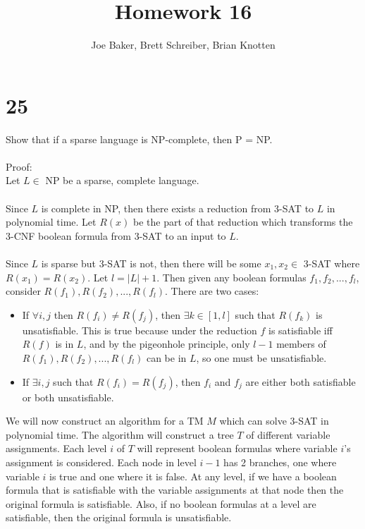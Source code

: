 \documentclass[letterpaper,notitlepage,twoside]{article}
\begin{document}
\title{Homework 16}
\author{Joe Baker, Brett Schreiber, Brian Knotten}
\maketitle

\section*{25}
Show that if a sparse language is NP-complete, then P = NP.
\\\\
Proof:
\\
Let $L \in $ NP be a sparse, complete language.
\\\\
Since $L$ is complete in NP, then there exists a reduction from 3-SAT to $L$ in polynomial time. Let $R(x)$ be the part of that reduction which transforms the 3-CNF boolean formula from 3-SAT to an input to $L$.
\\\\
Since $L$ is sparse but 3-SAT is not, then there will be some $x_1,x_2 \in $ 3-SAT where $R(x_1) = R(x_2)$. Let $l = \left|L\right| + 1$. Then given any boolean formulas $f_1,f_2,...,f_l$, consider $R(f_1),R(f_2),...,R(f_l)$. There are two cases:
\begin{itemize}
\item If $\forall i,j$ then $R(f_i) \neq R(f_j)$, then $\exists k \in \left[ 1,l \right]$ such that $R(f_k)$ is unsatisfiable. This is true because under the reduction $f$ is satisfiable iff $R(f)$ is in $L$, and by the pigeonhole principle, only $l-1$ members of $R(f_1),R(f_2),...,R(f_l)$ can be in $L$, so one must be unsatisfiable.
\item If $\exists i,j$ such that $R(f_i) = R(f_j)$, then $f_i$ and $f_j$ are either both satisfiable or both unsatisfiable.
\end{itemize}
We will now construct an algorithm for a TM $M$ which can solve 3-SAT in polynomial time. The algorithm will construct a tree $T$ of different variable assignments. Each level $i$ of $T$ will represent boolean formulas where variable $i$'s assignment is considered. Each node in level $i-1$ has 2 branches, one where variable $i$ is true and one where it is false. At any level, if we have a boolean formula that is satisfiable with the variable assignments at that node then the original formula is satisfiable. Also, if no boolean formulas at a level are satisfiable, then the original formula is unsatisfiable.
\\\\
\end{document}
